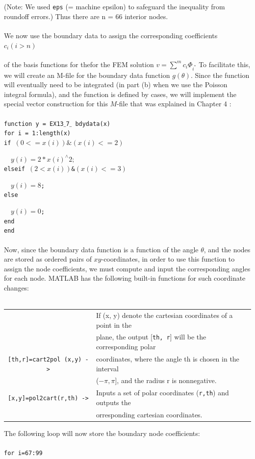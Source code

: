 \documentclass[../main.tex]{subfiles}
\begin{document}
\\
\\
(Note: We used \texttt{eps} (= machine epsilon) to safeguard the inequality from 
roundoff errors.) Thus there are n = 66 interior nodes.
\\
\\
We now use the boundary data to assign the corresponding coefficients $c_{i}(i>n)$
\\
\\
of the basis functions for thefor the FEM solution $v=\sum^{m} c_{i} \Phi_{i^{*}}$ To facilitate this, we will create an M-file for the boundary data function $g(\theta)$. Since the function will eventually need to be integrated (in part (b) when we use the Poisson integral formula), and the function is defined by cases, we will implement the special vector construction for this $M$-file that was explained in Chapter 4 :
\\
\\
\texttt{function y = EX13$\_$7$\_$ bdydata(x)}\\
\texttt{for i = 1:length(x)}\\
\texttt{if $(0<=x(i))\&(x(i)<=2)$}

~~\texttt{$y(i)=2*x(i)^{\wedge}2 ;$}\\
\texttt{elseif $(2<x(i))$\&$(x(i)<=3)$}

~~\texttt{$y(i)=8$;}\\
\texttt{else}

~~\texttt{$y(i)=0$;}\\
\texttt{end}\\
\texttt{end}
\\
\\
Now, since the boundary data function is a function of the angle $\theta$, and the nodes are stored as ordered pairs of $x y$-coordinates, in order to use this function to assign the node coefficients, we must compute and input the corresponding angles for each node. MATLAB has the following built-in functions for such coordinate changes:
\\
\\
\begin{center}
\begin{tabular}{|c|l|}
\hline
&If (x, y) denote the cartesian coordinates of a point in the\\
&plane, the output [\texttt{th, r}] will be the corresponding polar\\
\texttt{[th,r]=cart2pol (x,y) ->}&coordinates, where the angle th is chosen in the interval 
\\&($-\pi ,\pi$], and the radius r is nonnegative.\\
\hline
\texttt{[x,y]=pol2cart(r,th) ->} &Inputs a set of polar coordinates (\texttt{r,th}) and outputs the\\
&orresponding cartesian coordinates.\\
\hline
\end{tabular}
\end{center}
The following loop will now store the boundary node coefficients:
\\
\\
\texttt{for i=67:99}
\end{document}
